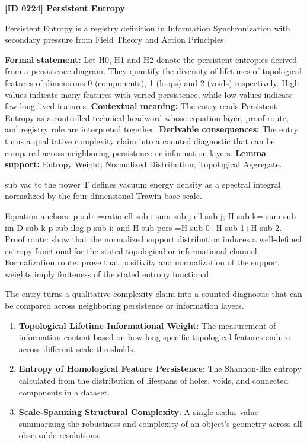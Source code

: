\clearpage
\noindent\textbf{[ID 0224] Persistent Entropy}\par
\vspace{0.35em}
\begingroup\small
{}
Persistent Entropy is a registry definition in Information Synchronization with secondary pressure from Field Theory and Action Principles.

\begingroup\footnotesize\setlength{\emergencystretch}{3em}\sloppy
\textbf{Formal statement:} Let H0, H1 and H2 denote the persistent entropies derived from a persistence diagram. They quantify the diversity of lifetimes of topological features of dimensions 0 (components), 1 (loops) and 2 (voids) respectively. High values indicate many features with varied persistence, while low values indicate few long-lived features. \textbf{Contextual meaning:} The entry reads Persistent Entropy as a controlled technical headword whose equation layer, proof route, and registry role are interpreted together. \textbf{Derivable consequences:} The entry turns a qualitative complexity claim into a counted diagnostic that can be compared across neighboring persistence or information layers. \textbf{Lemma support:} Entropy Weight; Normalized Distribution; Topological Aggregate.\par
\endgroup

sub vac to the power T defines vacuum energy density as a spectral integral normalized by the four-dimensional Trawin base scale.

Equation anchors: p sub i=ratio ell sub i sum sub j ell sub j; H sub k=-sum sub iin D sub k p sub ilog p sub i; and H sub pers =H sub 0+H sub 1+H sub 2. Proof route: show that the normalized support distribution induces a well-defined entropy functional for the stated topological or informational channel. Formalization route: prove that positivity and normalization of the support weights imply finiteness of the stated entropy functional.

The entry turns a qualitative complexity claim into a counted diagnostic that can be compared across neighboring persistence or information layers.
\endgroup

\begin{enumerate}[leftmargin=1.6em,itemsep=6pt,topsep=4pt]
\item \textbf{Topological Lifetime Informational Weight}: The measurement of information content based on how long specific topological features endure across different scale thresholds.
\item \textbf{Entropy of Homological Feature Persistence}: The Shannon-like entropy calculated from the distribution of lifespans of holes, voids, and connected components in a dataset.
\item \textbf{Scale-Spanning Structural Complexity}: A single scalar value summarizing the robustness and complexity of an object's geometry across all observable resolutions.
\end{enumerate}

